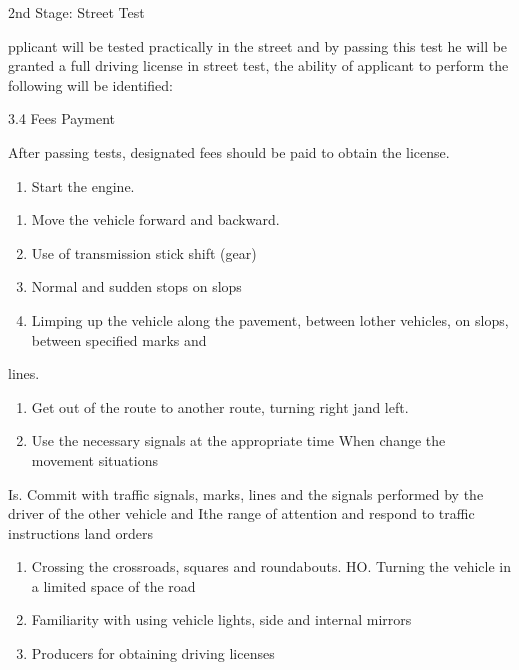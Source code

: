 \documentclass{book}
\begin{document}
2nd Stage: Street Test

pplicant will be tested practically in the street and by passing this
test he will be granted a full driving license in street test, the
ability of applicant to perform the following will be identified:

3.4 Fees Payment

After passing tests, designated fees should be paid to obtain the
license.

\begin{enumerate}
	\def\labelenumi{\roman{enumi}.}
	\tightlist
	\item
	      Start the engine.
\end{enumerate}

\begin{enumerate}
	\def\labelenumi{\arabic{enumi}.}
	\setcounter{enumi}{1}
	\item
	      Move the vehicle forward and backward.
	\item
	      Use of transmission stick shift (gear)
	\item
	      Normal and sudden stops on slops
	\item
	      Limping up the vehicle along the pavement, between lother vehicles, on
	      slops, between specified marks and
\end{enumerate}

lines.

\begin{enumerate}
	\def\labelenumi{\arabic{enumi}.}
	\setcounter{enumi}{5}
	\item
	      Get out of the route to another route, turning right jand left.
	\item
	      Use the necessary signals at the appropriate time When change the
	      movement situations
\end{enumerate}

Is. Commit with traffic signals, marks, lines and the signals performed
by the driver of the other vehicle and Ithe range of attention and
respond to traffic instructions land orders

\begin{enumerate}
	\def\labelenumi{\arabic{enumi}.}
	\setcounter{enumi}{8}
	\item
	      Crossing the crossroads, squares and roundabouts. HO. Turning the
	      vehicle in a limited space of the road
	\item
	      Familiarity with using vehicle lights, side and internal mirrors
	\item
	      Producers for obtaining driving licenses
\end{enumerate}
\end{document}
